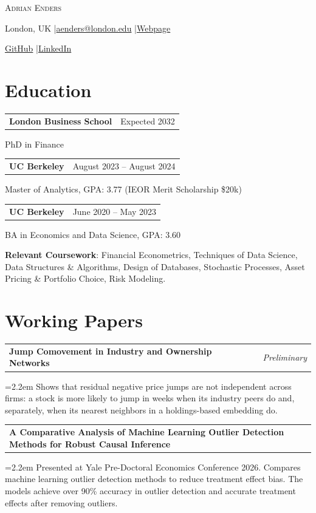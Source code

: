 \documentclass[11pt]{article}
\makeatletter
\newcommand{\entry}[2]{\begin{tabularx}{\textwidth}{@{}X r@{}}#1 & #2\end{tabularx}\par}
\newcommand{\project}[3]{\entry{\textbf{#1}}{\textit{#2}}{\leftskip=2.2em #3\par}\vspace{3pt}}
\makeatother
\begin{document}
{\centering
  {\LARGE\scshape Adrian Enders}\par\vspace{3pt}
  London, UK \enspace|\enspace \href{mailto:aenders@london.edu}{aenders@london.edu} \enspace|\enspace \href{https://ae4292.github.io}{Webpage}\par
  \href{https://github.com/ae4292}{GitHub} \enspace|\enspace \href{https://www.linkedin.com/in/adrian-enders-cal/}{LinkedIn}\par
}

\section{Education}
\entry{\textbf{London Business School}}{Expected 2032}
PhD in Finance\par\vspace{3pt}
\entry{\textbf{UC Berkeley}}{August 2023 -- August 2024}
Master of Analytics, GPA: 3.77 (IEOR Merit Scholarship \$20k)\par\vspace{3pt}
\entry{\textbf{UC Berkeley}}{June 2020 -- May 2023}
BA in Economics and Data Science, GPA: 3.60\par\vspace{3pt}
\textbf{Relevant Coursework}: Financial Econometrics, Techniques of Data Science, Data Structures \& Algorithms, Design of Databases, Stochastic Processes, Asset Pricing \& Portfolio Choice, Risk Modeling.

\section{Working Papers}
\project{Jump Comovement in Industry and Ownership Networks}{Preliminary}{Shows that residual negative price jumps are not independent across firms: a stock is more likely to jump in weeks when its industry peers do and, separately, when its nearest neighbors in a holdings-based embedding do.}
\project{A Comparative Analysis of Machine Learning Outlier Detection Methods for Robust Causal Inference}{}{Presented at Yale Pre-Doctoral Economics Conference 2026. Compares machine learning outlier detection methods to reduce treatment effect bias. The models achieve over 90\% accuracy in outlier detection and accurate treatment effects after removing outliers.}
\end{document}
